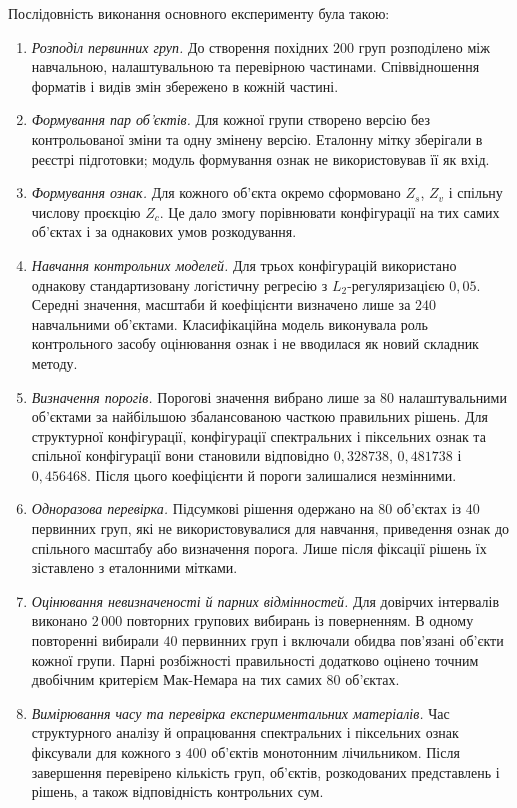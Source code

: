 Послідовність виконання основного експерименту була такою:

\begin{enumerate}
\item \textit{Розподіл первинних груп.} До створення похідних $200$ груп розподілено між навчальною, налаштувальною та перевірною частинами. Співвідношення форматів і видів змін збережено в кожній частині.

\item \textit{Формування пар об’єктів.} Для кожної групи створено версію без контрольованої зміни та одну змінену версію. Еталонну мітку зберігали в реєстрі підготовки; модуль формування ознак не використовував її як вхід.

\item \textit{Формування ознак.} Для кожного об’єкта окремо сформовано $Z_s$, $Z_v$ і спільну числову проєкцію $Z_c$. Це дало змогу порівнювати конфігурації на тих самих об’єктах і за однакових умов розкодування.

\item \textit{Навчання контрольних моделей.} Для трьох конфігурацій використано однакову стандартизовану логістичну регресію з $L_2$-регуляризацією $0{,}05$. Середні значення, масштаби й коефіцієнти визначено лише за $240$ навчальними об’єктами. Класифікаційна модель виконувала роль контрольного засобу оцінювання ознак і не вводилася як новий складник методу.

\item \textit{Визначення порогів.} Порогові значення вибрано лише за $80$ налаштувальними об’єктами за найбільшою збалансованою часткою правильних рішень. Для структурної конфігурації, конфігурації спектральних і піксельних ознак та спільної конфігурації вони становили відповідно $0{,}328738$, $0{,}481738$ і $0{,}456468$. Після цього коефіцієнти й пороги залишалися незмінними.

\item \textit{Одноразова перевірка.} Підсумкові рішення одержано на $80$ об’єктах із $40$ первинних груп, які не використовувалися для навчання, приведення ознак до спільного масштабу або визначення порога. Лише після фіксації рішень їх зіставлено з еталонними мітками.

\item \textit{Оцінювання невизначеності й парних відмінностей.} Для довірчих інтервалів виконано $2\,000$ повторних групових вибирань із поверненням. В одному повторенні вибирали $40$ первинних груп і включали обидва пов’язані об’єкти кожної групи. Парні розбіжності правильності додатково оцінено точним двобічним критерієм Мак-Немара на тих самих $80$ об’єктах.

\item \textit{Вимірювання часу та перевірка експериментальних матеріалів.} Час структурного аналізу й опрацювання спектральних і піксельних ознак фіксували для кожного з $400$ об’єктів монотонним лічильником. Після завершення перевірено кількість груп, об’єктів, розкодованих представлень і рішень, а також відповідність контрольних сум.
\end{enumerate}

